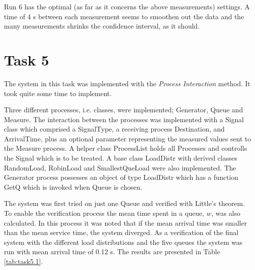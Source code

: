 \documentclass[]{article}
\begin{document}
Run 6 has the optimal (as far as it concerns the above measurements) settings.
A time of 4 s between each measurement seems to smoothen out the data and the many measurements shrinks the confidence interval, as it should.

\section{Task 5}
The system in this task was implemented with the {\it Process Interaction} method.
It took quite some time to implement.

Three different processes, i.e. classes, were implemented; Generator, Queue and Measure.
The interaction between the processes was implemented with a Signal class which comprised a SignalType, a receiving process Destination, and ArrivalTime, plus an optional parameter representing the measured values sent to the Measure process.
A helper class ProcessList holds all Processes and controlls the Signal which is to be treated.
A base class LoadDistr with derived classes RandomLoad, RobinLoad and SmallestQueLoad were also implemented.
The Generator process possesses an object of type LoadDistr which has a function GetQ which is invoked when Queue is chosen.

The system was first tried on just one Queue and verified with Little's theorem.
To enable the verification process the mean time spent in a queue, $w$, was also calculated.
In this process it was noted that if the mean arrival time was smaller than the mean service time, the system diverged.
As a verification of the final system with the different load distributions and the five queues the system was run with mean arrival time of 0.12 s.
The results are presented in Table \ref{tab:task5.1}.
\end{document}
